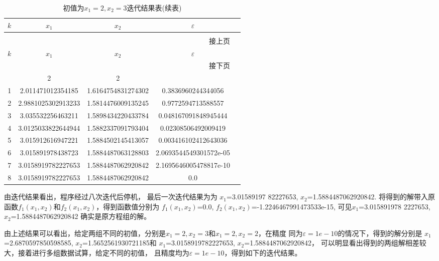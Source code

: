 \documentclass[UTF8,a4paper,12pt]{ctexart}
\begin{document}
\begin{longtable}{ccccc}
    \caption{初值为$x_1=2,x_2=2$迭代结果表}\\\hline
    $k$ & $x_1$ & $x_2$ & 
    \multicolumn{1}{c}{$\varepsilon$} \\\hline
    \endfirsthead
    \caption[]{初值为$x_1=2,x_2=3$迭代结果表(续表)}\\
    \multicolumn{4}{r}{\footnotesize 接上页}\\\hline
    $k$ & $x_1$ & $x_2$ & \multicolumn{1}{c}{$\varepsilon$}\\
    \hline\endhead
    \hline\multicolumn{4}{r}{\footnotesize 接下页}\\
    \endfoot\hline\hline\endlastfoot
    0 & 2 & 2  &   \\
    1 & 2.011471012354185  & 1.6164754831274302 & 0.3836960244344056  \\
    2 & 2.9881025302913233 & 1.5814476009135245 & 0.9772594713588557  \\
    3 & 3.035532256463211  & 1.5898434220433784 & 0.048167091848945444  \\
    4 & 3.0125033822644944 & 1.5882337091793404 & 0.02308506492009419   \\
    5 & 3.015912616947221  & 1.5884502145413057 & 0.003416102412643036   \\
    6 & 3.015891978438723  & 1.5884487063128803 & 2.0693544549301572e-05   \\
    7 & 3.0158919782227653 & 1.5884487062920842 & 2.1695646005478817e-10   \\
    8 & 3.0158919782227653 & 1.5884487062920842 & 0.0   \\
\end{longtable} 
由迭代结果看出，程序经过八次迭代后停机，
最后一次迭代结果为为
$x_1$=3.01589197 
82227653,
$x_2$=1.5884487062920842.
将得到的解带入原函数$f_1(x_1,x_2)$和$f_2(x_1,x_2)$，得到函数值分别为
$f_1(x_1,x_2)$=0.0,
$f_2(x_1,x_2)$=-1.2246467991473533e-15,
可见$x_1$=3.015891978 
2227653,
$x_2$=1.5884487062920842
确实是原方程组的解。

由上述结果可以看出，给定两组不同的初值，分别是$x_1=2,x_2=3$和$x_1=2,x_2=2$，在精度
同为$\varepsilon=1e-10$的情况下，得到的解分别是
$x_1$=2.6870597850598585,
$x_2$=1.5652561930721185和
$x_1$=3.0158919782227653,
$x_2$=1.5884487062920842，
可以明显看出得到的两组解相差较大，接着进行多组数据试算，给定不同的初值，
且精度均为$\varepsilon=1e-10$，得到如下的迭代结果。
\end{document}

